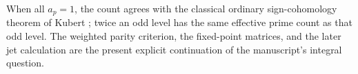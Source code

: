When all $a_p=1$, the count agrees with the classical ordinary
sign-cohomology theorem of Kubert \cite{intdist:KubertSign}; twice an odd
level has the same effective prime count as that odd level. The
weighted parity criterion, the fixed-point matrices, and the later
jet calculation are the present explicit continuation of the
manuscript's integral question.
